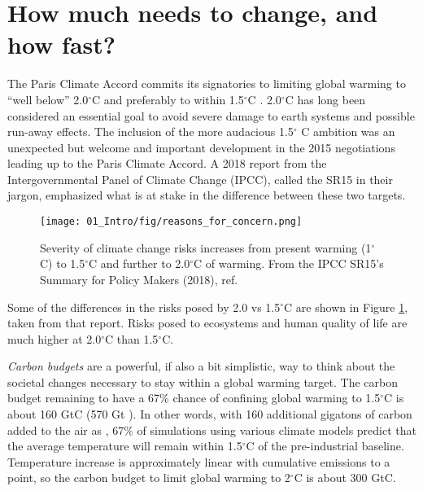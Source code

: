 
\section{How much needs to change, and how fast?}

The Paris Climate Accord commits its signatories to limiting global warming to ``well below'' 2.0$^\circ$C and preferably to within 1.5$^\circ$C \cite{UnitedNations2015}. 2.0$^\circ$C has long been considered an essential goal to avoid severe damage to earth systems and possible run-away effects\cite{Meinshausen2009, Allen2009, IPCC2014}. The inclusion of the more audacious 1.5$^\circ$ C ambition was an unexpected but welcome and important development in the 2015 negotiations leading up to the Paris Climate Accord. A 2018 report from the Intergovernmental Panel of Climate Change (IPCC), called the SR15 in their jargon, emphasized what is at stake in the difference between these two targets\cite{IPCC2018_SPM}. 
\begin{figure}[h!]
	\centering
	\texttt{[image: 01\_Intro/fig/reasons\_for\_concern.png]}
	\caption{Severity of climate change risks increases from present warming (1$^\circ$C) to 1.5$^\circ$C and further to 2.0$^\circ$C of warming. From the IPCC SR15's Summary for Policy Makers (2018), ref. \cite{IPCC2018_SPM}}
	\label{fig:RFC}
\end{figure}
Some of the differences in the risks posed by 2.0 vs 1.5$^\circ$C are shown in Figure \ref{fig:RFC}, taken from that report. Risks posed to ecosystems and human quality of life are much higher at 2.0$^\circ$C than 1.5$^\circ$C.

\textit{Carbon budgets} are a powerful, if also a bit simplistic\cite{Peters2018}, way to think about the societal changes necessary to stay within a global warming target. The carbon budget remaining to have a 67\% chance of confining global warming to 1.5$^\circ$C is about 160 GtC (570 Gt )\cite{IPCC2018_ch2}. In other words, with 160 additional gigatons of carbon added to the air as , 67\% of simulations using various climate models predict that the average temperature will remain within 1.5$^\circ$C of the pre-industrial baseline. Temperature increase is approximately linear with cumulative  emissions to a point\cite{IPCC2018_ch2}, so the carbon budget to limit global warming to 2$^\circ$C is about 300 GtC.

